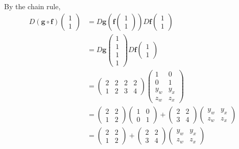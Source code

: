 \documentclass{exam}
\newcommand{\vf}{\mathbf{f}}
\newcommand{\vg}{\mathbf{g}}
\begin{document}
\begin{questions}
\begin{solution}
        By the chain rule,
        \begin{align*}
            D(\vg\circ\vf)\begin{pmatrix}
                1\\1
            \end{pmatrix} &= D\vg\left(\vf\begin{pmatrix}
                1\\1
            \end{pmatrix}\right) D\vf\begin{pmatrix}
                1\\1
            \end{pmatrix}\\
            &= D\vg\begin{pmatrix}
                1\\1\\1\\1
            \end{pmatrix}D\vf\begin{pmatrix}
                1\\1
            \end{pmatrix}\\
            &= \begin{pmatrix}
                2 & 2 & 2 & 2\\
                1&2&3&4
            \end{pmatrix}\begin{pmatrix}
                1&0\\0&1\\y_w&y_x\\z_w&z_x
            \end{pmatrix}\\
            &= \begin{pmatrix}
                2&2\\1&2
            \end{pmatrix}\begin{pmatrix}
                1&0\\0&1
            \end{pmatrix} + \begin{pmatrix}
                2&2\\3&4
            \end{pmatrix}\begin{pmatrix}
                y_w&y_x\\z_w&z_x
            \end{pmatrix}\\
            &=\begin{pmatrix}
                2&2\\1&2
            \end{pmatrix}+ \begin{pmatrix}
                2&2\\3&4
            \end{pmatrix}\begin{pmatrix}
                y_w&y_x\\z_w&z_x
            \end{pmatrix}
        \end{align*}


\end{solution}
\end{questions}
\end{document}
